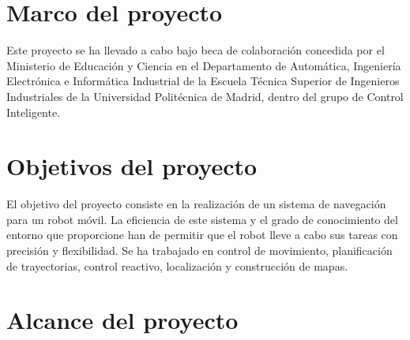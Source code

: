 \section{Marco del proyecto}

Este proyecto se ha llevado a cabo bajo beca de colaboración concedida por el Ministerio de Educación y Ciencia en el Departamento de Automática, Ingeniería Electrónica e Informática Industrial de la Escuela Técnica Superior de Ingenieros Industriales de la Universidad Politécnica de Madrid, dentro del grupo de Control Inteligente.

\section{Objetivos del proyecto}

El objetivo del proyecto consiste en la realización de un sistema de navegación para un robot móvil. La eficiencia de este sistema y el grado de conocimiento del entorno que proporcione han de permitir que el robot lleve a cabo sus tareas con precisión y flexibilidad. Se ha trabajado en control de movimiento, planificación de trayectorias, control reactivo, localización y construcción de mapas.

\section{Alcance del proyecto}

